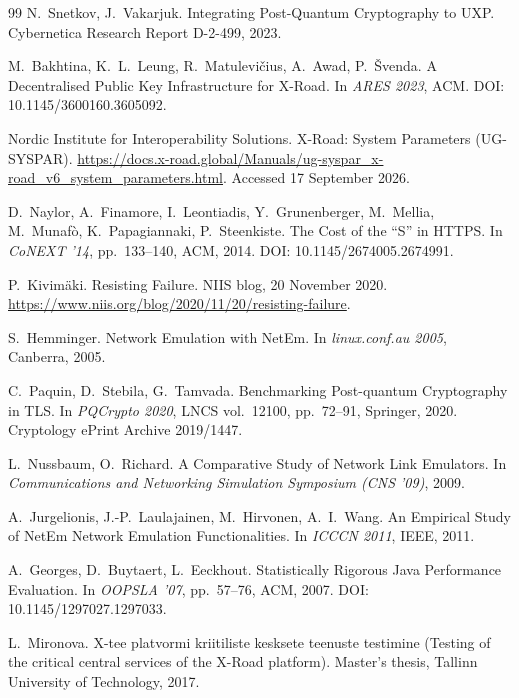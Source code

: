 \documentclass[conference,a4paper]{IEEEtran}
\begin{document}
\begin{thebibliography}{99}
N.~Snetkov, J.~Vakarjuk.
\newblock Integrating Post-Quantum Cryptography to UXP.
\newblock Cybernetica Research Report D-2-499, 2023.

M.~Bakhtina, K.~L.~Leung, R.~Matulevi\v{c}ius, A.~Awad, P.~\v{S}venda.
\newblock A Decentralised Public Key Infrastructure for X-Road.
\newblock In \emph{ARES 2023}, ACM.
\newblock DOI: 10.1145/3600160.3605092.

Nordic Institute for Interoperability Solutions.
\newblock X-Road: System Parameters (UG-SYSPAR).
\newblock \url{https://docs.x-road.global/Manuals/ug-syspar_x-road_v6_system_parameters.html}.
\newblock Accessed 17 September 2026.

D.~Naylor, A.~Finamore, I.~Leontiadis, Y.~Grunenberger, M.~Mellia, M.~Munaf\`{o},
K.~Papagiannaki, P.~Steenkiste.
\newblock The Cost of the ``S'' in HTTPS.
\newblock In \emph{CoNEXT '14}, pp.~133--140, ACM, 2014.
\newblock DOI: 10.1145/2674005.2674991.

P.~Kivim\"{a}ki.
\newblock Resisting Failure.
\newblock NIIS blog, 20 November 2020.
\newblock \url{https://www.niis.org/blog/2020/11/20/resisting-failure}.

S.~Hemminger.
\newblock Network Emulation with NetEm.
\newblock In \emph{linux.conf.au 2005}, Canberra, 2005.

C.~Paquin, D.~Stebila, G.~Tamvada.
\newblock Benchmarking Post-quantum Cryptography in TLS.
\newblock In \emph{PQCrypto 2020}, LNCS vol.~12100, pp.~72--91, Springer, 2020.
\newblock Cryptology ePrint Archive 2019/1447.

L.~Nussbaum, O.~Richard.
\newblock A Comparative Study of Network Link Emulators.
\newblock In \emph{Communications and Networking Simulation Symposium (CNS '09)}, 2009.

A.~Jurgelionis, J.-P.~Laulajainen, M.~Hirvonen, A.~I.~Wang.
\newblock An Empirical Study of NetEm Network Emulation Functionalities.
\newblock In \emph{ICCCN 2011}, IEEE, 2011.

A.~Georges, D.~Buytaert, L.~Eeckhout.
\newblock Statistically Rigorous Java Performance Evaluation.
\newblock In \emph{OOPSLA '07}, pp.~57--76, ACM, 2007.
\newblock DOI: 10.1145/1297027.1297033.

L.~Mironova.
\newblock X-tee platvormi kriitiliste kesksete teenuste testimine
(Testing of the critical central services of the X-Road platform).
\newblock Master's thesis, Tallinn University of Technology, 2017.

\end{thebibliography}
\end{document}
